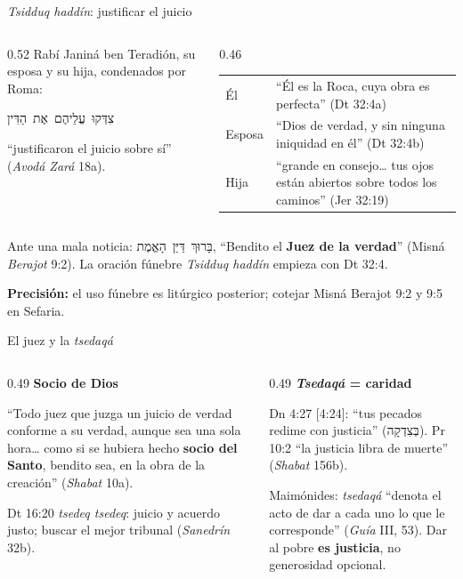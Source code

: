 \documentclass[hyperref={bookmarks=false},aspectratio=169]{beamer}
\newcommand{\heb}[1]{\mbox{\foreignlanguage{hebrew}{#1}}}
\newcommand{\destacar}[1]{\textbf{\textcolor{azul}{#1}}}
\newcommand{\precision}[1]{{\footnotesize\color{gris}\textbf{Precisión:} #1}}
\begin{document}
\begin{frame}{\emph{Tsidduq haddín}: justificar el juicio}
\begin{columns}[c,onlytextwidth]
\begin{column}{0.52\textwidth}\small
Rabí Janiná ben Teradión, su esposa y su hija, condenados por Roma:
\begin{center}\heb{צִדְּקוּ עֲלֵיהֶם אֶת הַדִּין}\end{center}
``justificaron el juicio sobre sí'' (\emph{Avodá Zará} 18a).
\end{column}
\begin{column}{0.46\textwidth}
\scriptsize\renewcommand{\arraystretch}{1.15}
\begin{tabular}{@{}>{\RaggedRight\arraybackslash}p{1.2cm}>{\RaggedRight\arraybackslash}p{3.8cm}@{}}
\toprule
Él & ``Él es la Roca, cuya obra es perfecta'' (Dt 32:4a) \\
Esposa & ``Dios de verdad, y sin ninguna iniquidad en él'' (Dt 32:4b) \\
Hija & ``grande en consejo\ldots{} tus ojos están abiertos sobre todos los caminos'' (Jer 32:19) \\
\bottomrule
\end{tabular}
\end{column}
\end{columns}\par\medskip
\small Ante una mala noticia: \heb{בָּרוּךְ דַּיַּן הָאֱמֶת}, ``Bendito el \destacar{Juez de la verdad}'' (Misná \emph{Berajot} 9:2). La oración fúnebre \emph{Tsidduq haddín} empieza con Dt 32:4.\par
\precision{el uso fúnebre es litúrgico posterior; cotejar Misná Berajot 9:2 y 9:5 en Sefaria.}
\end{frame}

\begin{frame}{El juez y la \emph{tsedaqá}}
\begin{columns}[t,onlytextwidth]
\begin{column}{0.49\textwidth}\small
\textbf{\color{azul}Socio de Dios}\par
``Todo juez que juzga un juicio de verdad conforme a su verdad, aunque sea una sola hora\ldots{} como si se hubiera hecho \destacar{socio del Santo}, bendito sea, en la obra de la creación'' (\emph{Shabat} 10a).\par\smallskip
Dt 16:20 \emph{tsedeq tsedeq}: juicio y acuerdo justo; buscar el mejor tribunal (\emph{Sanedrín} 32b).
\end{column}
\begin{column}{0.49\textwidth}\small
\textbf{\color{azul}\emph{Tsedaqá} = caridad}\par
Dn 4:27 [4:24]: ``tus pecados redime con justicia'' (\heb{בְּצִדְקָה}). Pr 10:2 ``la justicia libra de muerte'' (\emph{Shabat} 156b).\par\smallskip
Maimónides: \emph{tsedaqá} ``denota el acto de dar a cada uno lo que le corresponde'' (\emph{Guía} III, 53). Dar al pobre \destacar{es justicia}, no generosidad opcional.
\end{column}
\end{columns}
\end{frame}
\end{document}
